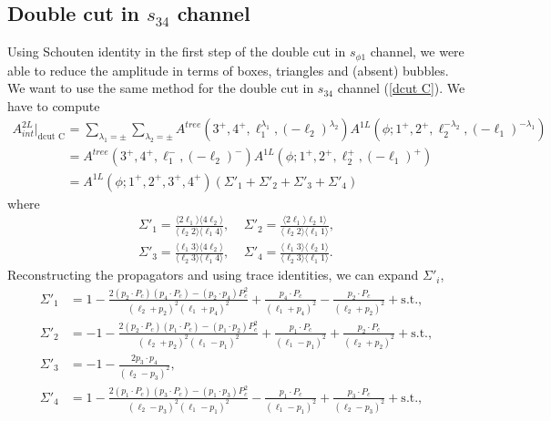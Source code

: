 \subsection{Double cut in $s_{34}$ channel}
Using Schouten identity in the first step of the double cut in $s_{\phi1}$ channel, we were able to reduce the amplitude in terms of boxes, triangles and (absent) bubbles.\\
We want to use the same method for the double cut in $s_{34}$ channel (\ref{dcut C}).
We have to compute
\begin{align*}
	A^{2L}_{int}|_{\text{dcut C}}&=\sum_{\lambda_1=\pm}\sum_{\lambda_2=\pm}A^{tree}(3^+,4^+,\ell_1^{\lambda_1},(-\ell_2)^{\lambda_2})A^{1L}(\phi;1^+,2^+,\ell_2^{-\lambda_2},(-\ell_1)^{-\lambda_1})\\
	&=A^{tree}(3^+,4^+,\ell_1^{-},(-\ell_2)^{-})A^{1L}(\phi;1^+,2^+,\ell_2^{+},(-\ell_1)^{+})\\
	&=A^{1L}(\phi;1^+,2^+,3^+,4^+)\left(\Sigma'_1+\Sigma'_2+\Sigma'_3+\Sigma'_4\right)
\end{align*}
where
\begin{align*}
	\Sigma'_1=\frac{\langle 2 \ell_1 \rangle\langle 4 \ell_2 \rangle}{\langle\ell_2 2\rangle\langle \ell_1 4 \rangle},\ \ \ \ \ \Sigma'_2=\frac{\langle 2 \ell_1 \rangle\ell_2 1 \rangle}{\langle\ell_2 2\rangle\langle \ell_1 1 \rangle},\\
	\Sigma'_3=\frac{\langle \ell_1 3 \rangle\langle 4 \ell_2 \rangle}{\langle\ell_2 3\rangle\langle \ell_1 4 \rangle}, \ \ \ \ \ 
	\Sigma'_4=\frac{\langle \ell_1 3 \rangle\langle \ell_2 1 \rangle}{\langle\ell_2 3\rangle\langle \ell_1 1 \rangle}.
\end{align*}
Reconstructing the propagators and using trace identities, we can expand $\Sigma'_i$,
\begin{align*}
	\Sigma'_1&=1-\frac{2(p_2\cdot P_c)(p_4\cdot P_c)-(p_2\cdot p_4)P_c^2}{(\ell_2+p_2)^2(\ell_1+p_4)^2}+\frac{p_4\cdot P_c}{(\ell_1+p_4)^2}-\frac{p_2\cdot P_c}{(\ell_2+p_2)^2}+\text{s.t.},\\
	\Sigma'_2&=-1-\frac{2(p_2\cdot P_c)(p_1\cdot P_c)-(p_1\cdot p_2)P_c^2}{(\ell_2+p_2)^2(\ell_1-p_1)^2}+\frac{p_1\cdot P_c}{(\ell_1-p_1)^2}+\frac{p_2\cdot P_c}{(\ell_2+p_2)^2}+\text{s.t.},\\
	\Sigma'_3&=-1-\frac{2p_3\cdot p_4}{(\ell_2-p_3)^2},\\
	\Sigma'_4&=1-\frac{2(p_1\cdot P_c)(p_3\cdot P_c)-(p_1\cdot p_3)P_c^2}{(\ell_2-p_3)^2(\ell_1-p_1)^2}-\frac{p_1\cdot P_c}{(\ell_1-p_1)^2}+\frac{p_3\cdot P_c}{(\ell_2-p_3)^2}+\text{s.t.},
\end{align*}
